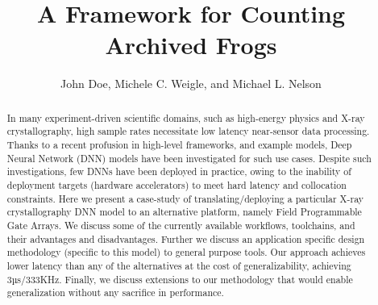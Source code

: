 \documentclass[sigconf,techreport]{acmart}
\begin{document}
\title{A Framework for Counting Archived Frogs}

\author{John Doe, Michele C. Weigle, and Michael L. Nelson}

\renewcommand{\shortauthors}{J. Doe et al.}


\begin{abstract}
In many experiment-driven scientific domains, such as high-energy physics and X-ray crystallography, high sample rates necessitate low latency near-sensor data processing.
Thanks to a recent profusion in high-level frameworks, and example models, Deep Neural Network (DNN) models have been investigated for such use cases.
Despite such investigations, few DNNs have been deployed in practice, owing to the inability of deployment targets (hardware accelerators) to meet hard latency and collocation constraints.
Here we present a case-study of translating/deploying a particular X-ray crystallography DNN model to an alternative platform, namely Field Programmable Gate Arrays.
We discuss some of the currently available workflows, toolchains, and their advantages and disadvantages.
Further we discuss an application specific design methodology (specific to this model) to general purpose tools.
Our approach achieves lower latency than any of the alternatives at the cost of generalizability, achieving 3µs/333KHz.
Finally, we discuss extensions to our methodology that would enable generalization without any sacrifice in performance.
\end{abstract}




\end{document}
